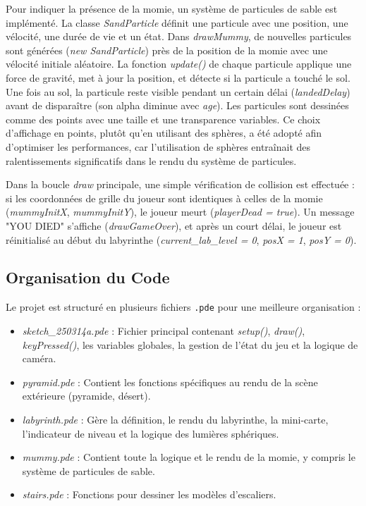 \documentclass[12pt,oneside,letterpaper]{article}
\begin{document}
Pour indiquer la présence de la momie, un système de particules de sable est implémenté. La classe \textit{SandParticle} définit une particule avec une position, une vélocité, une durée de vie et un état. Dans \textit{drawMummy}, de nouvelles particules sont générées (\textit{new SandParticle}) près de la position de la momie avec une vélocité initiale aléatoire. La fonction \textit{update()} de chaque particule applique une force de gravité, met à jour la position, et détecte si la particule a touché le sol. Une fois au sol, la particule reste visible pendant un certain délai (\textit{landedDelay}) avant de disparaître (son alpha diminue avec \textit{age}). Les particules sont dessinées comme des points avec une taille et une transparence variables. Ce choix d'affichage en points, plutôt qu'en utilisant des sphères, a été adopté afin d'optimiser les performances, car l'utilisation de sphères entraînait des ralentissements significatifs dans le rendu du système de particules.

Dans la boucle \textit{draw} principale, une simple vérification de collision est effectuée : si les coordonnées de grille du joueur sont identiques à celles de la momie (\textit{mummyInitX}, \textit{mummyInitY}), le joueur meurt (\textit{playerDead = true}). Un message "YOU DIED" s'affiche (\textit{drawGameOver}), et après un court délai, le joueur est réinitialisé au début du labyrinthe (\textit{current\_lab\_level = 0}, \textit{posX = 1}, \textit{posY = 0}).

\subsection{Organisation du Code}

Le projet est structuré en plusieurs fichiers \texttt{.pde} pour une meilleure organisation :

\begin{itemize} \item \textit{sketch\_250314a.pde} : Fichier principal contenant \textit{setup()}, \textit{draw()}, \textit{keyPressed()}, les variables globales, la gestion de l'état du jeu et la logique de caméra. \item \textit{pyramid.pde} : Contient les fonctions spécifiques au rendu de la scène extérieure (pyramide, désert). \item \textit{labyrinth.pde} : Gère la définition, le rendu du labyrinthe, la mini-carte, l'indicateur de niveau et la logique des lumières sphériques. \item \textit{mummy.pde} : Contient toute la logique et le rendu de la momie, y compris le système de particules de sable. \item \textit{stairs.pde} : Fonctions pour dessiner les modèles d'escaliers. \end{itemize}
\end{document}
